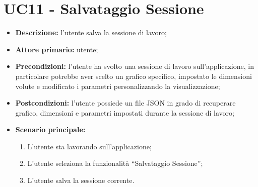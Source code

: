 \iffalse
\section{UC - Accesso al Manuale Sviluppatore}
\begin{itemize}
  \item \textbf{Descrizione}: essendo Login Warrior un progetto open source, un qualsiasi sviluppatore deve avere accesso ad un manuale sviluppatore (sia per manutenzione, sia per estendere il software);
  \item \textbf{Attore primario}: sviluppatore;
  \item \textbf{Precondizioni}: nessuna, l'opzione di accesso ai manuali deve essere sempre disponibile allo sviluppatore;
  \item \textbf{Postcondizioni}: viene visualizzato il manuale sviluppatore;
  \item \textbf{Scenario principale}:
  \begin{enumerate}
    \item Lo sviluppatore seleziona il "manuale sviluppatore";
    \item Viene visualizzato il manuale sviluppatore.
  \end{enumerate}
\end{itemize}
\fi

\section{UC11 - Salvataggio Sessione}

\begin{itemize}
  \item \textbf{Descrizione:} l'utente salva la sessione di lavoro;
  \item \textbf{Attore primario:} utente;
  \item \textbf{Precondizioni:} l'utente ha svolto una sessione di lavoro sull'applicazione, in particolare potrebbe aver scelto un grafico specifico, impostato le dimensioni volute e modificato i parametri personalizzando la visualizzazione;
  \item \textbf{Postcondizioni:} l'utente possiede un file JSON in grado di recuperare grafico, dimensioni e parametri impostati durante la sessione di lavoro;
  \item \textbf{Scenario principale:}
  \begin{enumerate}
    \item L'utente sta lavorando sull'applicazione;
    \item L'utente seleziona la funzionalità ``Salvataggio Sessione'';
    \item L'utente salva la sessione corrente.
  \end{enumerate}
\end{itemize}
